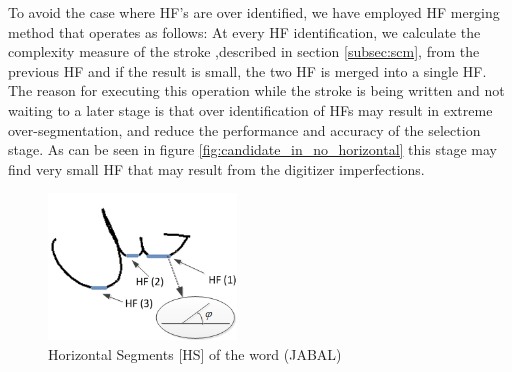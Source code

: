 \documentclass[journal,compsoc]{IEEEtran}
\begin{document}
To avoid the case where HF's are over identified, we have employed HF merging method that operates as follows: At every HF identification, we calculate the complexity measure of the stroke ,described in section \ref{subsec:scm}, from the previous HF and if the result is small, the two HF is merged into a single HF.
The reason for executing this operation while the stroke is being written and not waiting to a later stage is that over identification of HFs may result in extreme over-segmentation, and reduce the performance and accuracy of the selection stage. As can be seen in figure \ref{fig:candidate_in_no_horizontal} this stage may find very small HF that may result from the digitizer imperfections. 


\begin{figure}
\centering
\includegraphics[width=5cm]{./figures/horizontal_segments}
\caption{Horizontal Segments [HS] of the word (JABAL)}
\label{fig:horizontal_segments}
\end{figure}
\end{document}
